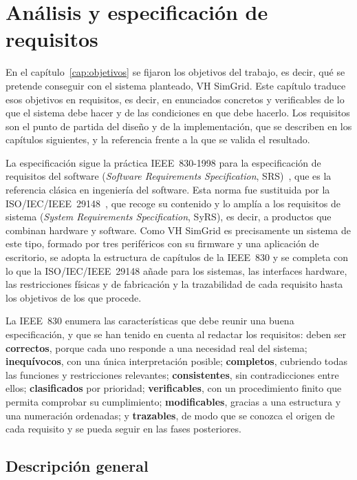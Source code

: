 \chapter{Análisis y especificación de requisitos}
\label{cap:requisitos}
En el capítulo~\ref{cap:objetivos} se fijaron los objetivos del trabajo, es decir, qué se pretende conseguir con el sistema planteado, VH SimGrid. Este capítulo traduce esos objetivos en requisitos, es decir, en enunciados concretos y verificables de lo que el sistema debe hacer y de las condiciones en que debe hacerlo. Los requisitos son el punto de partida del diseño y de la implementación, que se describen en los capítulos siguientes, y la referencia frente a la que se valida el resultado.

La especificación sigue la práctica IEEE~830-1998 para la especificación de requisitos del software (\emph{Software Requirements Specification}, SRS)~\cite{ieee830}, que es la referencia clásica en ingeniería del software. Esta norma fue sustituida por la ISO/IEC/IEEE~29148~\cite{iso29148}, que recoge su contenido y lo amplía a los requisitos de sistema (\emph{System Requirements Specification}, SyRS), es decir, a productos que combinan hardware y software. Como VH SimGrid es precisamente un sistema de este tipo, formado por tres periféricos con su firmware y una aplicación de escritorio, se adopta la estructura de capítulos de la IEEE~830 y se completa con lo que la ISO/IEC/IEEE~29148 añade para los sistemas, las interfaces hardware, las restricciones físicas y de fabricación y la trazabilidad de cada requisito hasta los objetivos de los que procede.

La IEEE~830 enumera las características que debe reunir una buena especificación, y que se han tenido en cuenta al redactar los requisitos: deben ser \textbf{correctos}, porque cada uno responde a una necesidad real del sistema; \textbf{inequívocos}, con una única interpretación posible; \textbf{completos}, cubriendo todas las funciones y restricciones relevantes; \textbf{consistentes}, sin contradicciones entre ellos; \textbf{clasificados} por prioridad; \textbf{verificables}, con un procedimiento finito que permita comprobar su cumplimiento; \textbf{modificables}, gracias a una estructura y una numeración ordenadas; y \textbf{trazables}, de modo que se conozca el origen de cada requisito y se pueda seguir en las fases posteriores.

\section{Descripción general}
\label{sec:req-descripcion}
